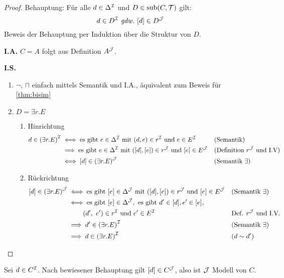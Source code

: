 \begin{tafel}\mbox{}
\begin{proof}
    Behauptung:
Für alle $d \in \Delta^{\mathcal{I}}$ und $D \in \operatorname{sub}(C,\mathcal{T})$ gilt:
\[ d \in D^\MI \gdw \left\lbrack d \right\rbrack \in D^{\MJ} \]
Beweis der Behauptung per Induktion über die Struktur von $D$.

\textbf{I.A.} $C = A$ folgt aus Definition $A^{\mathcal{J}}$.

\textbf{I.S.}

\begin{enumerate}
    \item $\neg$, $\sqcap$ einfach mittels Semantik und I.A., äquivalent zum Beweis für \autoref{thm:bisim}
\item $D = \exists r.E$
  \begin{enumerate}
  \def\labelenumi{\alph{enumi}.}
  \def\labelenumii{\alph{enumii}.}
  \item Hinrichtung
      \begin{align*}
          d \in \left( \exists r.E \right)^\MI
          &\iff \text{es gibt }e \in \Delta^\MI \text{ mit } \left( d,e \right) \in r^\MI \text{ und } e \in E^\MI && \text{(Semantik)}\\
          &\implies \text{es gibt }e \in \Delta^\MI \text{ mit }\left( \left\lbrack d \right\rbrack,\left\lbrack e \right\rbrack \right) \in r^{\MJ} \text{ und } \left\lbrack e \right\rbrack \in E^{\MJ} && \text{(Definition $r^\MJ$ und I.V)}\\
          & \iff \left\lbrack d \right\rbrack \in \left( \exists r.E \right)^{\MJ} && \text{(Semantik $\exists$)}
      \end{align*}
    \item Rückrichtung
        \begin{align*}
            \left\lbrack d \right\rbrack \in \left( \exists r.E \right)^{\MJ} 
            &\iff \text{es gibt }[e] \in \Delta^{\MJ} \text{ mit } \left( \left\lbrack d \right\rbrack,\left\lbrack e \right\rbrack \right) \in r^{\MJ}\text{ und }\left\lbrack e \right\rbrack \in E^{\MJ}  && \text{(Semantik $\exists$)}\\
            &\iff \text{es gibt }[e] \in \Delta^{\MJ}, \text{ es gibt }d' \in \left\lbrack d \right\rbrack, e' \in \left\lbrack e \right\rbrack, \\
            & \hphantom{\iff} \left( d',\ e' \right) \in r^\MI  \text{ und }e' \in E^\MI && \text{Def. $r^\MJ$ und I.V.}\\
            &\implies d' \in \left( \exists r.E \right)^\MI && \text{(Semantik $\exists$)}\\
            &\implies  d \in \left( \exists r.E \right)^\MI && (d \sim d')
        \end{align*}
\end{enumerate}
\end{enumerate}
\end{proof}
Sei $d \in C^{\mathcal{I}}$. Nach bewiesener Behauptung gilt $[d] \in C^{\mathcal{J}}$, also ist $\mathcal{J}$ Modell von $C$.


\end{tafel}
